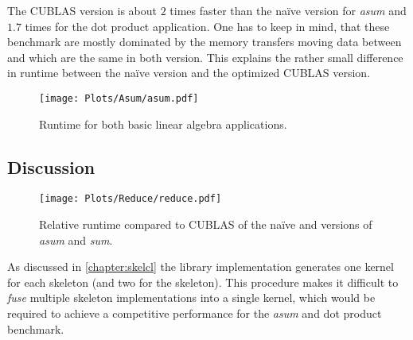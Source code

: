 The CUBLAS version is about $2$ times faster than the na{\"i}ve \OpenCL version for \emph{asum} and $1.7$ times for the dot product application.
One has to keep in mind, that these benchmark are mostly dominated by the memory transfers moving data between \CPU and \GPU which are the same in both version.
This explains the rather small difference in runtime between the na{\"i}ve \OpenCL version and the optimized CUBLAS version.

\begin{figure}[tb]
  \centering
  \texttt{[image: Plots/Asum/asum.pdf]}
  \caption{Runtime for both basic linear algebra applications.}
  \label{fig:skelcl:asum:dot}
\end{figure}

\subsection*{Discussion}

\begin{figure}[tb]
  \centering
  \texttt{[image: Plots/Reduce/reduce.pdf]}
  \caption{Relative runtime compared to CUBLAS of the na{\"i}ve \OpenCL and \SkelCL versions of \emph{asum} and \emph{sum}.}
  \label{fig:skelcl:reduce}
\end{figure}
As discussed in \autoref{chapter:skelcl} the \SkelCL library implementation generates one \OpenCL kernel for each skeleton (and two for the \reduce skeleton).
This procedure makes it difficult to \emph{fuse} multiple skeleton implementations into a single \OpenCL kernel, which would be required to achieve a competitive performance for the \emph{asum} and dot product benchmark.


